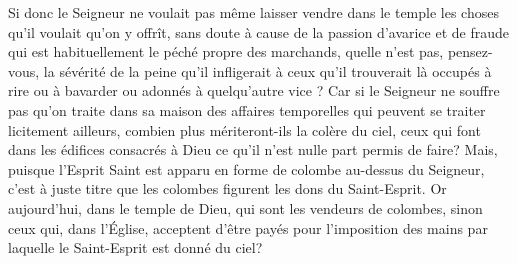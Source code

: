 Si donc le Seigneur ne voulait pas même laisser vendre dans le temple
	les choses qu’il voulait qu’on y offrît,
	sans doute à cause de la passion d’avarice et de fraude
		qui est habituellement le péché propre des marchands,
	quelle n’est pas, pensez-vous, la sévérité de la peine qu’il infligerait
	à ceux qu’il trouverait là occupés à rire ou à bavarder
		ou adonnés à quelqu’autre vice ?
Car si le Seigneur ne souffre pas
		qu’on traite dans sa maison des affaires temporelles
	qui peuvent se traiter licitement ailleurs,
	combien plus mériteront-ils la colère du ciel,
	ceux qui font dans les édifices consacrés à Dieu
		ce qu’il n’est nulle part permis de faire?
Mais, puisque l’Esprit Saint
		est apparu en forme de colombe au-dessus du Seigneur,
	c’est à juste titre que les colombes figurent les dons du Saint-Esprit.
Or aujourd’hui, dans le temple de Dieu, qui sont les vendeurs de colombes,
	sinon ceux qui, dans l’Église, acceptent d’être payés
	pour l’imposition des mains par laquelle le Saint-Esprit est donné du ciel?
